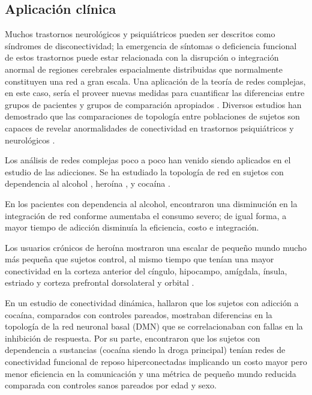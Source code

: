 \subsection{Aplicación clínica}
Muchos trastornos neurológicos y psiquiátricos pueden ser descritos como síndromes de disconectividad; la emergencia de síntomas o deficiencia funcional de estos trastornos puede estar relacionada con la disrupción o integración anormal de regiones cerebrales espacialmente distribuidas que normalmente constituyen una red a gran escala. Una aplicación de la teoría de redes complejas, en este caso, sería el proveer nuevas medidas para cuantificar las diferencias entre grupos de pacientes y grupos de comparación apropiados \parencite{Bullmore2009a}. Diversos estudios han demostrado que las comparaciones de topología entre poblaciones de sujetos son capaces de revelar anormalidades de conectividad en trastornos psiquiátricos y neurológicos \parencite{Bassett2009}. \par
Los análisis de redes complejas poco a poco han venido siendo aplicados en el estudio de las adicciones. Se ha estudiado la topología de red en sujetos con dependencia al alcohol \parencite{Sjoerds2017}, heroína \parencite{Liu2009}, y cocaína \parencite{Zhang2018, Wang2015a}. \par
En los pacientes con dependencia al alcohol, \textcite{Sjoerds2017} encontraron una disminución en la integración de red conforme aumentaba el consumo severo; de igual forma, a mayor tiempo de adicción disminuía la eficiencia, costo e integración.\par
Los usuarios crónicos de heroína mostraron una escalar de pequeño mundo mucho más pequeña que sujetos control, al mismo tiempo que tenían una mayor conectividad en la corteza anterior del cíngulo, hipocampo, amígdala, ínsula, estriado y corteza prefrontal dorsolateral y orbital \parencite{Liu2009}. \par
En un estudio de conectividad dinámica, \textcite{Zhang2018} hallaron que los sujetos con adicción a cocaína, comparados con controles pareados, mostraban diferencias en la topología de la red neuronal basal (DMN) que se correlacionaban con fallas en la inhibición de respuesta.
Por su parte, \textcite{Wang2015a} encontraron que los sujetos con dependencia a sustancias (cocaína siendo la droga principal) tenían redes de conectividad funcional de reposo hiperconectadas \textemdash{}implicando un costo mayor\textemdash{} pero menor eficiencia en la comunicación y una métrica de pequeño mundo reducida comparada con controles sanos pareados por edad y sexo.
